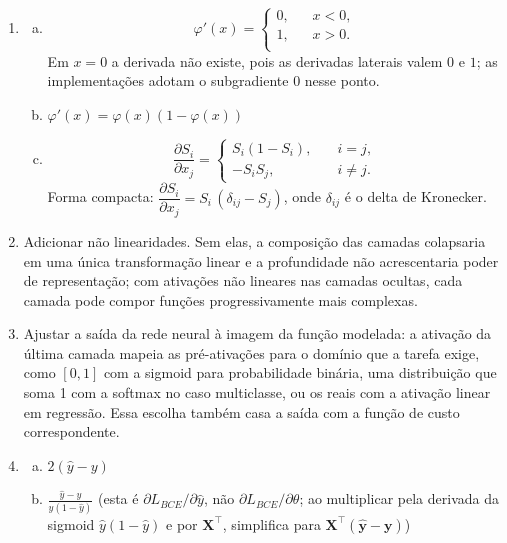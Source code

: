 \documentclass{dlproblemset}
\begin{document}
\begin{enumerate}[1)]
    \item
    \begin{enumerate}[a)]
        \item \[
\varphi'(x) =
     \begin{cases}
       \text{0,} &\quad x < 0,\\
       \text{1,} &\quad x > 0.\\
     \end{cases}
\]
        Em $x=0$ a derivada não existe, pois as derivadas laterais valem $0$ e $1$; as implementações adotam o subgradiente $0$ nesse ponto.
        \item $\varphi'(x)=\varphi(x)(1-\varphi(x))$
        \item {} \[
        \frac{\partial S_i}{\partial x_j} =
     \begin{cases}
       S_i(1-S_i), &\quad i=j,\\
       -S_i S_j,   &\quad i\neq j.
     \end{cases}
\]
        Forma compacta: $\dfrac{\partial S_i}{\partial x_j} = S_i\,(\delta_{ij} - S_j)$, onde $\delta_{ij}$ é o delta de Kronecker.
    \end{enumerate}

    \item Adicionar não linearidades. Sem elas, a composição das camadas colapsaria em uma única transformação linear e a profundidade não acrescentaria poder de representação; com ativações não lineares nas camadas ocultas, cada camada pode compor funções progressivamente mais complexas.

    \item Ajustar a saída da rede neural à imagem da função modelada: a ativação da última camada mapeia as pré-ativações para o domínio que a tarefa exige, como $[0,1]$ com a sigmoid para probabilidade binária, uma distribuição que soma 1 com a softmax no caso multiclasse, ou os reais com a ativação linear em regressão. Essa escolha também casa a saída com a função de custo correspondente.

    \item
    \begin{enumerate}[a)]
    \item $2(\hat{y}-y)$
    \item $\frac{\hat{y}-y}{\hat{y}(1-\hat{y})}$ \quad ({\footnotesize esta é $\partial L_{BCE} / \partial \hat y$, não $\partial L_{BCE} / \partial \theta$; ao multiplicar pela derivada da sigmoid $\hat y(1-\hat y)$ e por $\mathbf{X}^\top$, simplifica para $\mathbf{X}^\top(\hat{\mathbf{y}} - \mathbf{y})$})
    \end{enumerate}


\end{enumerate}
\end{document}
